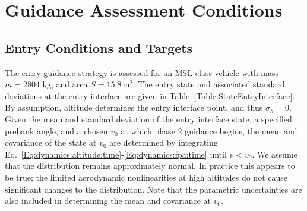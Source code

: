 \chapter{Guidance Assessment Conditions}\label{Ch:AssessmentConditions}

\section{Entry Conditions and Targets}
The entry guidance strategy is assessed for an MSL-class vehicle with mass $m = 2804$ kg, and area $S = 15.8\, \mathrm{m}^2$. The entry state and associated standard deviations at the entry interface are given in Table~\ref{Table:StateEntryInterface}. By assumption, altitude determines the entry interface point, and thus $\sigma_h = 0$. Given the mean and standard deviation of the entry interface state, a specified prebank angle, and a chosen $v_0$ at which phase 2 guidance begins, the mean and covariance of the state at $v_0$ are determined by integrating Eq.~\eqref{Eq:dynamics:altitude:time}-\eqref{Eq:dynamics:fpa:time} until $v<v_0$. We assume that the distribution remains approximately normal. In practice this appears to be true; the limited aerodynamic nonlinearities at high altitudes do not cause significant changes to the distribution. Note that the parametric uncertainties are also included in determining the mean and covariance at $v_0$.


